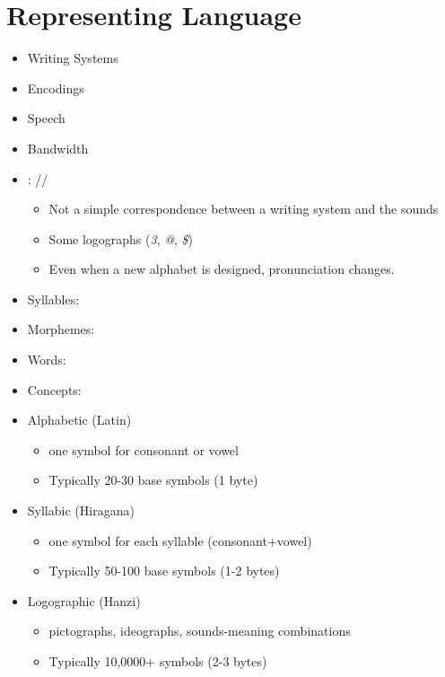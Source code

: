 \documentclass[a4paper,landscape,headrule,footrule,xetex]{foils}
\begin{document}
\section{Representing Language}

\begin{itemize}
\item Writing Systems
\item Encodings
\item Speech
\item Bandwidth
\end{itemize}


\begin{itemize}
\item \ul{}:  // 
  \begin{itemize}
  \item Not a  simple correspondence between a writing system
    and the sounds
  \item Some logographs (\textit{3}, \textit{@}, \textit{\$})
  \item Even when a new alphabet is designed, pronunciation changes.
  \end{itemize}
\item Syllables:   
\item Morphemes:  
\item Words:  
\item Concepts:   
\end{itemize}


\begin{itemize}
\item Alphabetic (Latin)
  \begin{itemize}
  \item  one symbol for consonant or vowel
  \item Typically 20-30 base symbols (1 byte)
  \end{itemize}
\item Syllabic (Hiragana)
  \begin{itemize}
  \item  one symbol for each syllable (consonant+vowel)
  \item Typically 50-100 base symbols (1-2 bytes)
  \end{itemize}
\item Logographic (Hanzi)
  \begin{itemize}
  \item pictographs, ideographs, sounds-meaning combinations
  \item Typically 10,0000+ symbols (2-3 bytes)
  \end{itemize}


\end{itemize}
\end{document}
